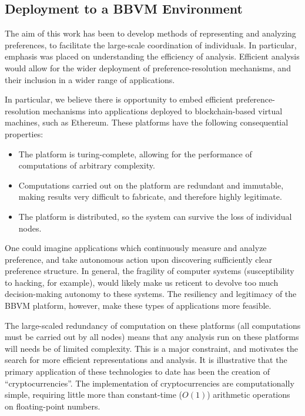 \subsection{Deployment to a BBVM Environment}

The aim of this work has been to develop methods of representing and analyzing preferences, to facilitate the large-scale coordination of individuals.
In particular, emphasis was placed on understanding the efficiency of analysis.
Efficient analysis would allow for the wider deployment of preference-resolution mechanisms, and their inclusion in a wider range of applications.

\bigskip

In particular, we believe there is opportunity to embed efficient preference-resolution mechanisms into applications deployed to blockchain-based virtual machines, such as Ethereum.
These platforms have the following consequential properties:

\begin{itemize}
	\item The platform is turing-complete, allowing for the performance of computations of arbitrary complexity.
	\item Computations carried out on the platform are redundant and immutable, making results very difficult to fabricate, and therefore highly legitimate.
	\item The platform is distributed, so the system can survive the loss of individual nodes.
\end{itemize}

One could imagine applications which continuously measure and analyze preference, and take autonomous action upon discovering sufficiently clear preference structure.
In general, the fragility of computer systems (susceptibility to hacking, for example), would likely make us reticent to devolve too much decision-making autonomy to these systems.
The resiliency and legitimacy of the BBVM platform, however, make these types of applications more feasible.

\bigskip

The large-scaled redundancy of computation on these platforms (all computations must be carried out by all nodes) means that any analysis run on these platforms will needs be of limited complexity.
This is a major constraint, and motivates the search for more efficient representations and analysis.
It is illustrative that the primary application of these technologies to date has been the creation of ``cryptocurrencies''.
The implementation of cryptocurrencies are computationally simple, requiring little more than constant-time ($O(1)$) arithmetic operations on floating-point numbers.

